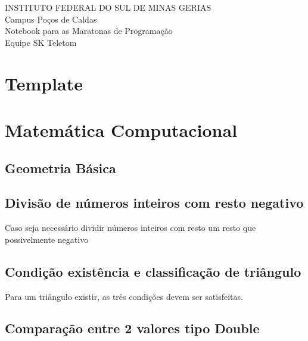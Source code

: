 \documentclass[a4paper,12pt]{article}
\begin{document}
\begin{center}
\Large{INSTITUTO FEDERAL DO SUL DE MINAS GERIAS}\\
\large{Campus Poços de Caldas}\\
\vspace{10cm}
\Large{Notebook para as Maratonas de Programação}\\
\large{Equipe SK Teletom}
\end{center}

\newpage
\tableofcontents
\thispagestyle{empty}

\newpage
\section{Template}

\newpage
\section{Matemática Computacional}

\subsection{Geometria Básica}



\subsection{Divisão de números inteiros com resto negativo}

Caso seja necessário dividir números inteiros com resto um resto que possivelmente negativo


\subsection{Condição existência e classificação de triângulo}

Para um triângulo existir, as três condições devem ser satisfeitas.


\subsection{Comparação entre 2 valores tipo Double}
\end{document}

